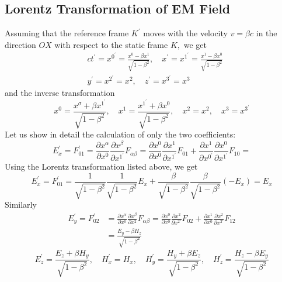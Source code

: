 \subsection{Lorentz Transformation of EM Field}
Assuming that the reference frame $K^{\prime}$ moves with the velocity $v=\beta c$ in the direction $O X$ with respect to the static frame $K,$ we get
\begin{equation}
\begin{aligned}
&c t^{\prime}=x^{0^{\prime}}=\frac{x^{0}-\beta x^{1}}{\sqrt{1-\beta^{2}}}, \quad x^{\prime}=x^{1^{\prime}}=\frac{x^{1}-\beta x^{0}}{\sqrt{1-\beta^{2}}}\\
&y^{\prime}=x^{2^{\prime}}=x^{2}, \quad z^{\prime}=x^{3^{\prime}}=x^{3}
\end{aligned}
\end{equation}
and the inverse transformation
\begin{equation}
x^{0}=\frac{x^{\sigma}+\beta x^{1^{\prime}}}{\sqrt{1-\beta^{2}}}, \quad x^{1}=\frac{x^{1^{\prime}}+\beta x^{0}}{\sqrt{1-\beta^{2}}}, \quad x^{2}=x^{2}, \quad x^{3}=x^{3^{\prime}}
\end{equation}
Let us show in detail the calculation of only the two coefficients:
\begin{equation}
E_{x}^{\prime}=F_{01}^{\prime}=\frac{\partial x^{\alpha}}{\partial x^{0}} \frac{\partial x^{\beta}}{\partial x^{1^{\prime}}} F_{\alpha \beta}=\frac{\partial x^{0}}{\partial x^{0}} \frac{\partial x^{1}}{\partial x^{1^{\prime}}} F_{01}+\frac{\partial x^{1}}{\partial x^{0^{\prime}}} \frac{\partial x^{0}}{\partial x^{1^{\prime}}} F_{10}=
\end{equation}
Using the Lorentz transformation listed above, we get
\begin{equation}
E_{x}^{\prime}=F_{01}^{\prime}=\frac{1}{\sqrt{1-\beta^{2}}} \frac{1}{\sqrt{1-\beta^{2}}} E_{x}+\frac{\beta}{\sqrt{1-\beta^{2}}} \frac{\beta}{\sqrt{1-\beta^{2}}}\left(-E_{x}\right)=E_{x}
\end{equation}
Similarly
\begin{equation}
\begin{aligned}
E_{y}^{\prime}=F_{02}^{\prime} &=\frac{\partial x^{\alpha}}{\partial x^{0}} \frac{\partial x^{\beta}}{\partial x^{2}} F_{\alpha \beta}=\frac{\partial x^{0}}{\partial x^{0}} \frac{\partial x^{2}}{\partial x^{2 \prime}} F_{02}+\frac{\partial x^{1}}{\partial x^{0}} \frac{\partial x^{2}}{\partial x^{2 \prime}} F_{12} \\
&=\frac{E_{y}-\beta H_{z}}{\sqrt{1-\beta^{2}}}
\end{aligned}
\end{equation}
\begin{equation}
E_{z}^{\prime}=\frac{E_{z}+\beta H_{y}}{\sqrt{1-\beta^{2}}}, \quad H_{x}^{\prime}=H_{x}, \quad H_{y}^{\prime}=\frac{H_{y}+\beta E_{z}}{\sqrt{1-\beta^{2}}}, \quad H_{z}^{\prime}=\frac{H_{z}-\beta E_{y}}{\sqrt{1-\beta^{2}}}
\end{equation}

